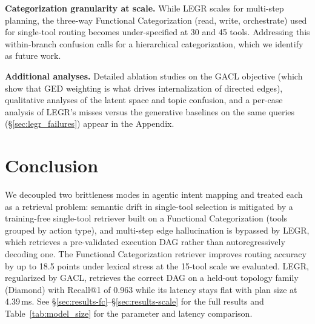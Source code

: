 \documentclass{article}
\begin{document}
\textbf{Categorization granularity at scale.} While LEGR scales for multi-step planning, the three-way Functional Categorization (read, write, orchestrate) used for single-tool routing becomes under-specified at 30 and 45 tools. Addressing this within-branch confusion calls for a hierarchical categorization, which we identify as future work.

\textbf{Additional analyses.} Detailed ablation studies on the GACL objective (which show that GED weighting is what drives internalization of directed edges), qualitative analyses of the latent space and topic confusion, and a per-case analysis of LEGR's misses versus the generative baselines on the same queries (\S\ref{sec:legr_failures}) appear in the Appendix.


\section{Conclusion}

We decoupled two brittleness modes in agentic intent mapping and treated each as a retrieval problem: semantic drift in single-tool selection is mitigated by a training-free single-tool retriever built on a Functional Categorization (tools grouped by action type), and multi-step edge hallucination is bypassed by LEGR, which retrieves a pre-validated execution DAG rather than autoregressively decoding one. The Functional Categorization retriever improves routing accuracy by up to 18.5 points under lexical stress at the 15-tool scale we evaluated. LEGR, regularized by GACL, retrieves the correct DAG on a held-out topology family (Diamond) with Recall@1 of 0.963 while its latency stays flat with plan size at 4.39\,ms. See \S\ref{sec:results-fc}--\S\ref{sec:results-scale} for the full results and Table~\ref{tab:model_size} for the parameter and latency comparison.
\end{document}
